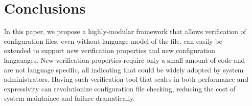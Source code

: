 
\section{Conclusions}

In this paper, we propose a highly-modular framework that allows verification of configuration files, even without language model of the file.
\app can easily be extended to support new verification properties and new configuration langauages.
New verification properties require only a small amount of code and are not language specific, all indicating that \app could be widely adopted by system administrators.
Having such verification tool that scales in both performance and expressivity can revolutionize configuration file checking, reducing the cost of system maintaince and failure dramatically.
